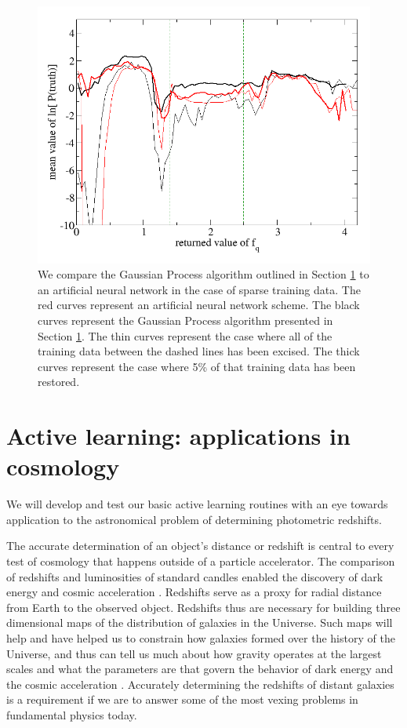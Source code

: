\documentclass[useAMS,usenatbib,tightenlines,11pt,preprint]{aastex}
\begin{document}
\begin{figure}
\centerline{\includegraphics[scale=0.3]{doe_desert_plot.png}}
\caption{
We compare the Gaussian Process algorithm outlined in Section \ref{sec:photoz}
to an artificial neural network in the case of sparse training data.  The red
curves represent an artificial neural network scheme.  The black curves
represent the Gaussian Process algorithm presented in Section \ref{sec:photoz}. 
The thin curves represent the case where all of the training data between the
dashed lines has been excised.  The thick curves represent the case where 5\% of
that training data has been restored.
}
\label{fig:desert}
\end{figure}


\section{Active learning: applications in cosmology}
\label{sec:photoz}

We will develop and test our basic active learning routines with an eye towards
application to the astronomical 
problem of determining photometric redshifts.

The accurate determination of an object's distance or redshift is
central to every test of cosmology that happens outside of a particle
accelerator.  The comparison of redshifts and luminosities of standard
candles enabled the discovery of dark energy and cosmic acceleration
\cite{perlmutter1998}. Redshifts serve as a proxy for radial distance
from Earth to the observed object.  Redshifts thus are necessary for
building three dimensional maps of the distribution of galaxies in the
Universe.  Such maps will help and have helped us to constrain how
galaxies formed over the history of the Universe, and thus can tell us
much about how gravity operates at the largest scales and what the
parameters are that govern the behavior of dark energy and the cosmic
acceleration \cite{muvarpi2,roland,sudeep}.  Accurately determining the redshifts of
distant galaxies is a requirement if we are to answer some of the most
vexing problems in fundamental physics today.
\end{document}
